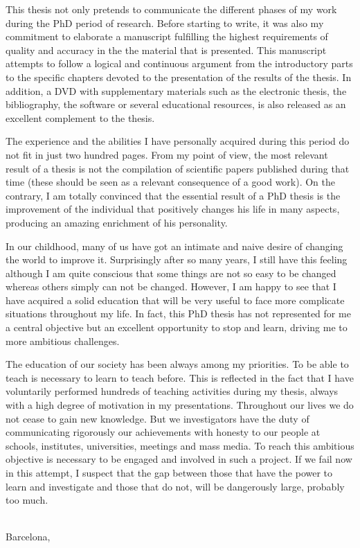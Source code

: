 This thesis not only pretends to communicate the different phases of my work during the PhD
period of research. Before starting to write, it was also my commitment to elaborate a
manuscript fulfilling the highest requirements of quality and accuracy in the
the material that is presented. This manuscript attempts to follow a logical and continuous
argument from the introductory parts to the specific chapters devoted to the presentation
of the results of the thesis. In addition, a DVD with supplementary materials such as
the electronic thesis, the bibliography, the software or several educational resources,
is also released as an excellent complement to the thesis.

The experience and the abilities I have personally acquired during this period do not fit in
just two hundred pages. From my point of view, the most relevant result of a thesis is not
the compilation of scientific papers published during that time (these should be seen as a
relevant consequence of a good work). On the contrary, I am totally convinced that the essential
result of a PhD thesis is the improvement of the individual that positively changes his life
in many aspects, producing an amazing enrichment of his personality.

In our childhood, many of us have got an intimate and naive desire of changing the
world to improve it. Surprisingly after so many years, I still have this feeling although
I am quite conscious that some things are not so easy to be changed whereas others simply
can not be changed. However, I am happy to see that I have acquired a solid education that
will be very useful to face more complicate situations throughout my life. In fact, this PhD thesis
has not represented for me a central objective but an excellent opportunity to stop and learn,
driving me to more ambitious challenges.

The education of our society has been always among my priorities. To be able to teach is necessary
to learn to teach before. This is reflected in the fact that I have voluntarily performed hundreds
of teaching activities during my thesis, always with a high degree of motivation in my presentations.
Throughout our lives we do not cease to gain new knowledge. But we investigators have the duty of
communicating rigorously our achievements with honesty to our people at schools, institutes, universities,
meetings and mass media. To reach this ambitious objective is necessary to be engaged and involved
in such a project. If we fail now in this attempt, I suspect that the gap between those that have
the power to learn and investigate and those that do not, will be dangerously large, probably too much.


\begin{flushright}
\\
Barcelona, \thydate\\
\end{flushright}



